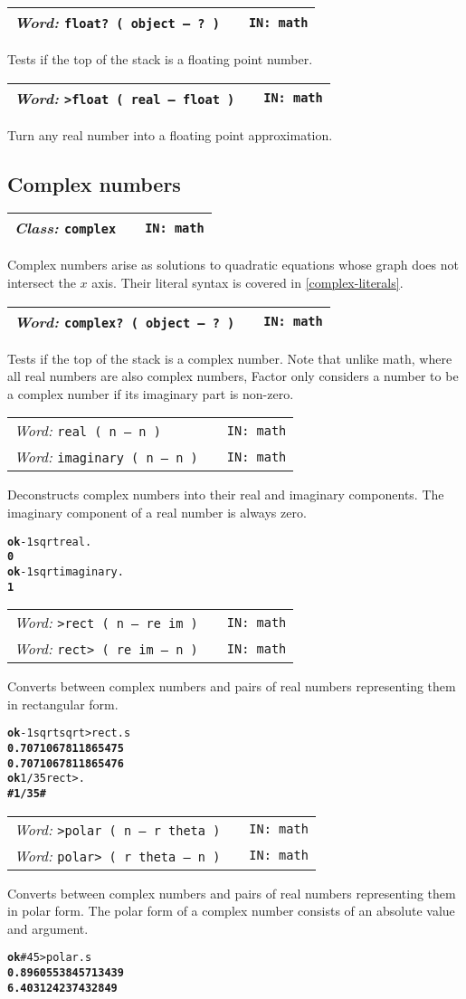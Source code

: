 \documentclass{report}
\newcommand{\tto}{\symbol{123}}
\newcommand{\ttc}{\symbol{125}}
\newcommand{\ordinaryword}[3]{\index{#1}
\emph{Word:} \texttt{#2} &&\texttt{IN: #3}}
\newcommand{\classword}[2]{\index{#1}
\emph{Class:} \texttt{#1} &&\texttt{IN: #2}}
\newcommand{\predword}[2]{\ordinaryword{#1}{#1~( object -- ?~)}{#2}}
\newcommand{\wordtable}[1]{

\begin{tabularx}{12cm}[t]{lXr}
\hline
#1\\
\hline
\end{tabularx}

}
\begin{document}
\wordtable{
\predword{float?}{math}
}
Tests if the top of the stack is a floating point number.
\wordtable{
\ordinaryword{>float}{>float ( real -- float )}{math}
}
Turn any real number into a floating point approximation.

\subsection{\label{complex-numbers}Complex numbers}

\wordtable{
\classword{complex}{math}
}
Complex numbers arise as solutions to quadratic equations whose graph does not intersect the $x$ axis. Their literal syntax is covered in \ref{complex-literals}.

\wordtable{
\predword{complex?}{math}
}
Tests if the top of the stack is a complex number. Note that unlike math, where all real numbers are also complex numbers, Factor only considers a number to be a complex number if its imaginary part is non-zero.

\wordtable{
\ordinaryword{real}{real ( n -- n )}{math}\\
\ordinaryword{imaginary}{imaginary ( n -- n )}{math}
}
Deconstructs complex numbers into their real and imaginary components. The imaginary component of a real number is always zero.
\begin{alltt}
\textbf{ok} -1 sqrt real .
\textbf{0}
\textbf{ok} -1 sqrt imaginary .
\textbf{1}
\end{alltt}
\wordtable{
\ordinaryword{>rect}{>rect ( n -- re im )}{math}\\
\ordinaryword{rect>}{rect> ( re im -- n )}{math}
}
Converts between complex numbers and pairs of real numbers representing them in rectangular form.
\begin{alltt}
\textbf{ok} -1 sqrt sqrt >rect .s
\textbf{0.7071067811865475
0.7071067811865476}
\textbf{ok} 1/3 5 rect> .
\textbf{\#\tto 1/3 5 \ttc\#}
\end{alltt}

\wordtable{
\ordinaryword{>polar}{>polar ( n -- r theta )}{math}\\
\ordinaryword{polar>}{polar> ( r theta -- n )}{math}
}
Converts between complex numbers and pairs of real numbers representing them in polar form. The polar form of a complex number consists of an absolute value and argument.
\begin{alltt}
\textbf{ok} \#\tto 4 5 \ttc >polar .s
\textbf{0.8960553845713439
6.403124237432849}
\end{alltt}
\end{document}
